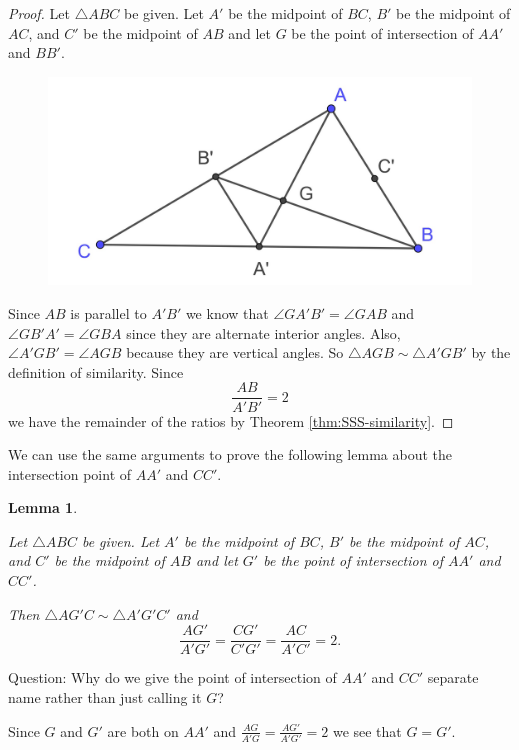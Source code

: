 \documentclass[
]{book}
\newtheorem{lemma}{Lemma}[chapter]
\theoremstyle{definition}
\theoremstyle{definition}
\theoremstyle{definition}
\theoremstyle{definition}
\theoremstyle{remark}
\begin{document}
\begin{proof}

Let \(\triangle ABC\) be given. Let \(A'\) be the midpoint of \(BC\), \(B'\) be the midpoint of \(AC\), and \(C'\) be the midpoint of \(AB\) and let \(G\) be the point of intersection of \(AA'\) and \(BB'\).

\begin{figure}

{\centering \includegraphics[width=0.4\linewidth]{images/centroid2} 

}

\end{figure}

Since \(AB\) is parallel to \(A'B'\) we know that \(\angle GA'B' = \angle GAB\) and \(\angle GB'A' = \angle GBA\) since they are alternate interior angles. Also, \(\angle A'GB' = \angle AGB\) because they are vertical angles. So \(\triangle AGB \sim \triangle A'GB'\) by the definition of similarity. Since \[\frac{AB}{A'B'} = 2\] we have the remainder of the ratios by Theorem \ref{thm:SSS-similarity}.

\end{proof}

We can use the same arguments to prove the following lemma about the intersection point of \(AA'\) and \(CC'\).

\begin{lemma}
\protect\hypertarget{lem:unlabeled-div-187}{}\label{lem:unlabeled-div-187}

Let \(\triangle ABC\) be given. Let \(A'\) be the midpoint of \(BC\), \(B'\) be the midpoint of \(AC\), and \(C'\) be the midpoint of \(AB\) and let \(G'\) be the point of intersection of \(AA'\) and \(CC'\).

Then \(\triangle AG'C \sim \triangle A'G'C'\) and \[\frac{AG'}{A'G'} = \frac{CG'}{C'G'} = \frac{AC}{A'C'} = 2.\]

\end{lemma}

Question: Why do we give the point of intersection of \(AA'\) and \(CC'\) separate name rather than just calling it \(G\)?

Since \(G\) and \(G'\) are both on \(AA'\) and \(\frac{AG}{A'G} = \frac{AG'}{A'G'} = 2\) we see that \(G=G'\).
\end{document}

